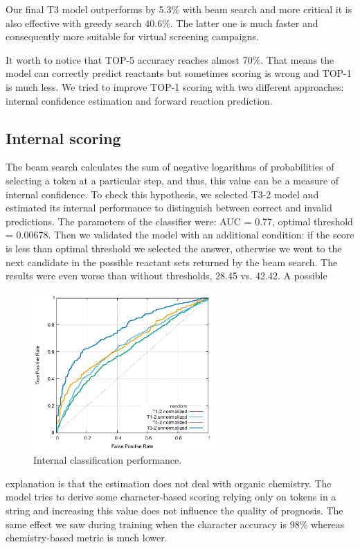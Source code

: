 \documentclass{article}
\begin{document}
Our final T3 model outperforms \cite{Pande} by 5.3\% with beam search and more critical it is also effective with greedy search 40.6\%. The latter one is much faster and consequently more suitable for virtual screening campaigns. 

It worth to notice that TOP-5 accuracy reaches almost 70\%. That means the model can correctly predict reactants but sometimes scoring is wrong and TOP-1 is much less. We tried to improve TOP-1 scoring with two different approaches: internal confidence estimation and forward reaction prediction. 

\subsection{Internal scoring}

The beam search calculates the sum of negative logarithms of probabilities of selecting a token at a particular step, and thus, this value can be a measure of internal confidence. To check this hypothesis, we selected T3-2 model and estimated its internal performance to distinguish between correct and invalid predictions.  The parameters of the classifier were: AUC = 0.77, optimal threshold = 0.00678. Then we validated the model with an additional condition: if the score is less than optimal threshold we selected the answer, otherwise we went to the next candidate in the possible reactant sets returned by the beam search. The results were even worse than without thresholds, 28.45 vs. 42.42.   A possible\begin{figure}  
  \vspace{-0.2cm}
  \includegraphics[width = 7cm]{images/auc.pdf}
  \caption{Internal classification performance.}
  \label{fig:auc}
  \vspace{-1.7cm}
\end{figure}
 explanation is that the estimation does not deal with organic chemistry. The model tries to derive some character-based scoring relying only on tokens in a string and increasing this value does not influence the quality of prognosis. The same effect we saw during training when the character accuracy is 98\% whereas chemistry-based metric is much lower. 
 
\end{document}
